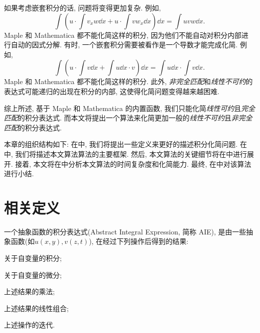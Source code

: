 如果考虑嵌套积分的话, 问题将变得更加复杂. 例如, 
\begin{equation}
\int\!{\left(u\cdot\int\!{v_xw\dd x}+u\cdot\int\!{vw_x\dd x}\right)\dd x}=\int\!{uvw\dd x}.
\label{nested_integral}
\end{equation}
Maple 和 Mathematica 都不能化简这样的积分, 因为他们不能自动对积分内部进行自动的因式分解. 有时, 一个嵌套积分需要被看作是一个导数才能完成化简. 例如,
\begin{equation}
\int\!{\left(u\cdot\int\!{v\dd x}+\int\!{u\dd x}\cdot v\right)\dd x}=\int\!{u\dd x}\cdot\int\!{v\dd x}.
\label{integral_as_differential}
\end{equation}
Maple 和 Mathematica 都不能化简这样的积分. 此外, \emph{非完全匹配}和\emph{线性不可约}的表达式可能递归的出现在积分的内部, 这使得化简问题变得越来越困难.

综上所述, 基于 Maple 和 Mathematica 的内置函数, 我们只能化简\emph{线性可约}且\emph{完全匹配}的积分表达式. 而本文将提出一个算法来化简更加一般的\emph{线性不可约}且\emph{非完全匹配}的积分表达式.

本章的组织结构如下: 在中, 我们将提出一些定义来更好的描述积分化简问题. 在中, 我们将描述本文算法算法的主要框架. 然后, 本文算法的关键细节将在中进行展开. 接着, 本文将在中分析本文算法的时间复杂度和化简能力. 最终, 在中对该算法进行小结.

\section{相关定义}\label{Definitions-03}
\begin{definition}
一个抽象函数的积分表达式(Abstract Integral Expression, 简称 AIE), 是由一些抽象函数(如$u(x,y),v(z,t)$), 在经过下列操作后得到的结果:
\begin{compactenum}[(1) ]
\item 关于自变量的积分;
\item 关于自变量的微分;
\item 上述结果的乘法;
\item 上述结果的线性组合;
\item 上述操作的迭代.
\end{compactenum}
\end{definition}

